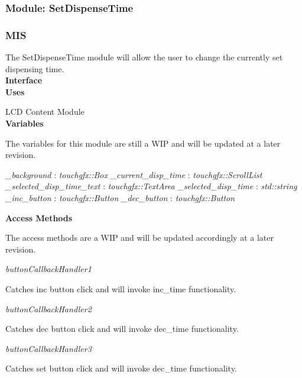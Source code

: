 \documentclass[12pt,titlepage]{article}
\begin{document}
\subsubsection{Module: SetDispenseTime}
\subsubsection*{MIS}

\noindent The SetDispenseTime module will allow the user to change the currently set dispensing time.  \\

\noindent \textbf{Interface} \\

\noindent \textbf{Uses}

\noindent LCD Content Module \\

\noindent \textbf{Variables}

\noindent The variables for this module are still a WIP and will be updated at a later revision. \par

\noindent \textit{\_background} : \textit{touchgfx::Box} \newline
\noindent \textit{\_current\_disp\_time} : \textit{touchgfx::ScrollList} \newline
\noindent \textit{\_selected\_disp\_time\_text} : \textit{touchgfx::TextArea} \newline
\noindent \textit{\_selected\_disp\_time} : \textit{std::string} \newline
\noindent \textit{\_inc\_button} : \textit{touchgfx::Button} \newline
\noindent \textit{\_dec\_button} : \textit{touchgfx::Button} \newline


\noindent \textbf{Access Methods}

\noindent The access methods are a WIP and will be updated accordingly at a later revision. \par

\textit{buttonCallbackHandler1} \par
Catches inc button click and will invoke inc\_time functionality.

\textit{buttonCallbackHandler2} \par
Catches dec button click and will invoke dec\_time functionality.

\textit{buttonCallbackHandler3} \par
Catches set button click and will invoke dec\_time functionality.
\end{document}
